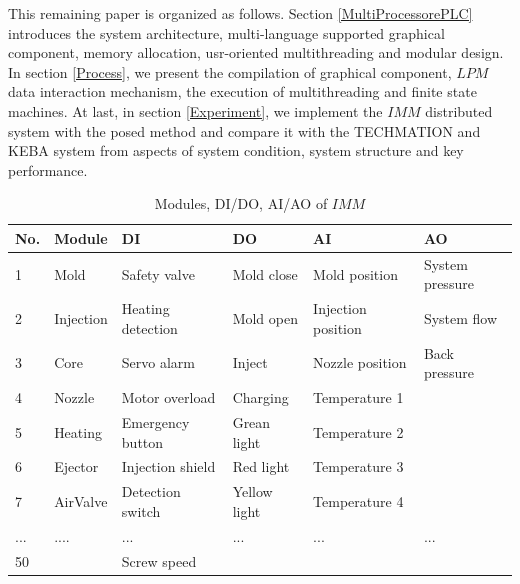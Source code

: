 \documentclass[journal,UTF8]{IEEEtran}
\begin{document}
This remaining paper is organized as follows. Section \ref{MultiProcessorePLC} introduces the system architecture, multi-language supported graphical component, memory allocation, usr-oriented multithreading and modular design. In section \ref{Process}, we present the compilation of graphical component, $LPM$ data interaction mechanism, the execution of multithreading and finite state machines. At last, in section \ref{Experiment}, we implement the $IMM$ distributed system with the posed method and compare it with the TECHMATION and KEBA system from aspects of system condition, system structure and key performance.
\begin{table}
	\scriptsize \caption{Modules, DI/DO, AI/AO of $IMM$}
	\label{table:IMMSystem}
	\begin{center}
		\renewcommand{\arraystretch}{1.4}
		\setlength\tabcolsep{3pt}
		\begin{tabular}{|p{0.3cm}|p{0.8cm}|p{1.8cm}|p{1.2cm}|p{1.8cm}|p{1.7cm}|}
			\hline
			No. & Module      & DI                       & DO           & AI                     & AO\\
			\hline
			1  & Mold       & Safety valve & Mold close     & Mold position        &System pressure \\
			\hline
			2  & Injection  & Heating detection & Mold open      & Injection position    &System flow\\
			\hline
			3  & Core      & Servo alarm         & Inject          & Nozzle position      &Back pressure\\
			\hline
			4  & Nozzle    & Motor overload            & Charging         & Temperature 1        &  \\
			\hline
			5  & Heating   & Emergency button           & Grean light       & Temperature 2        &\\
			\hline
			6  & Ejector   & Injection shield          & Red light         & Temperature 3       &\\
			\hline
			7  & AirValve & Detection switch          & Yellow light       & Temperature 4      &\\
            \hline
			...  & ....        & ...                       & ...                & ...                &...\\
            \hline
			50  &             & Screw speed                &                    &                     & \\
\hline
		\end{tabular}
	\end{center}
\end{table}
\end{document}
